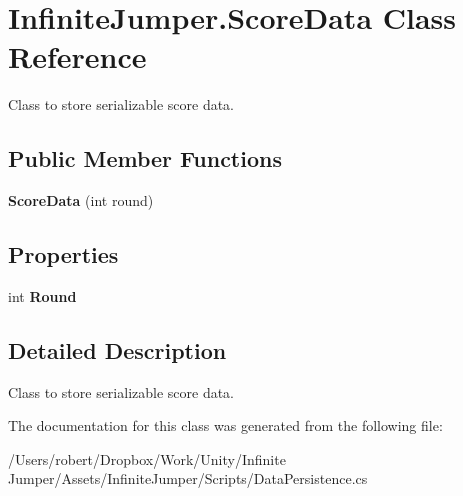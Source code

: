 \hypertarget{class_infinite_jumper_1_1_score_data}{}\section{Infinite\+Jumper.\+Score\+Data Class Reference}
\label{class_infinite_jumper_1_1_score_data}


Class to store serializable score data.  


\subsection*{Public Member Functions}
\begin{DoxyCompactItemize}
\item 
\hypertarget{class_infinite_jumper_1_1_score_data_a76213a8d15f5a0bd9ef6044d041393dc}{}{\bfseries Score\+Data} (int round)\label{class_infinite_jumper_1_1_score_data_a76213a8d15f5a0bd9ef6044d041393dc}

\end{DoxyCompactItemize}
\subsection*{Properties}
\begin{DoxyCompactItemize}
\item 
\hypertarget{class_infinite_jumper_1_1_score_data_ac4365fd849843b5a0ef62d8444ecb7ee}{}int {\bfseries Round}\label{class_infinite_jumper_1_1_score_data_ac4365fd849843b5a0ef62d8444ecb7ee}

\end{DoxyCompactItemize}


\subsection{Detailed Description}
Class to store serializable score data. 



The documentation for this class was generated from the following file\+:\begin{DoxyCompactItemize}
\item 
/\+Users/robert/\+Dropbox/\+Work/\+Unity/\+Infinite Jumper/\+Assets/\+Infinite\+Jumper/\+Scripts/Data\+Persistence.\+cs\end{DoxyCompactItemize}
